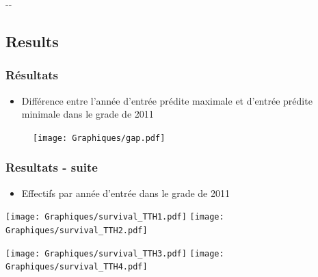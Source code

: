 \documentclass[xcolor=table,ignorenonframetext,12pt]{beamer}
\newlength{\offsetpage}
\newenvironment{widepage}{\begin{adjustwidth}{-\offsetpage}{-\offsetpage}%
		\addtolength{\textwidth}{2\offsetpage}}%
	{\end{adjustwidth}}
\begin{document}
\begin{frame}
\begin{widepage}
\begin{center}
{\begin{tikzpicture}[node distance=5cm, sibling distance = 7cm]
%
\end{tikzpicture}
}

\end{center}

\end{widepage}
\begin{flushright}
	\hyperlink{chevauchements}{}
\end{flushright}

\end{frame}

\subsection{Results}
\begin{frame}
\frametitle{Résultats}
\begin{itemize}
\item Différence entre l'année d'entrée prédite maximale et d'entrée prédite minimale dans le grade de 2011
\end{itemize}
\begin{figure}
\vspace{-0.5cm}
\texttt{[image: Graphiques/gap.pdf]}
\end{figure}

\end{frame}

\begin{frame}
\frametitle{Resultats - suite}
\begin{itemize}
	\item Effectifs par année d'entrée dans le grade de 2011
\end{itemize}
\begin{center}
	\texttt{[image: Graphiques/survival\_TTH1.pdf]}
	\texttt{[image: Graphiques/survival\_TTH2.pdf]}
\end{center}
\begin{center}
	\texttt{[image: Graphiques/survival\_TTH3.pdf]}
	\texttt{[image: Graphiques/survival\_TTH4.pdf]}
\end{center}

\end{frame}
\end{document}
